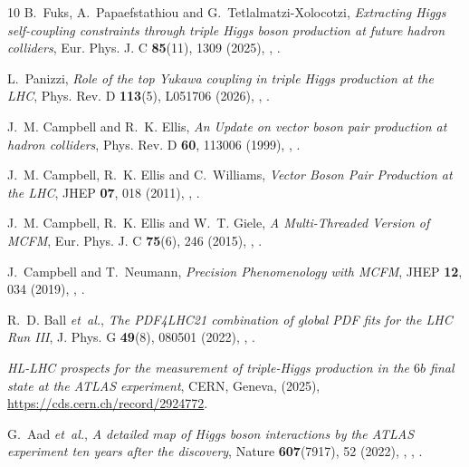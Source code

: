 \documentclass{SciPost}
\begin{document}
\begin{thebibliography}{10}
B.~Fuks, A.~Papaefstathiou and G.~Tetlalmatzi-Xolocotzi,
\newblock \emph{{Extracting Higgs self-coupling constraints through triple Higgs boson production at future hadron colliders}},
\newblock Eur. Phys. J. C \textbf{85}(11), 1309 (2025),
\newblock {},
\newblock {}.

L.~Panizzi,
\newblock \emph{{Role of the top Yukawa coupling in triple Higgs production at the LHC}},
\newblock Phys. Rev. D \textbf{113}(5), L051706 (2026),
\newblock {},
\newblock {}.

J.~M. Campbell and R.~K. Ellis,
\newblock \emph{{An Update on vector boson pair production at hadron colliders}},
\newblock Phys. Rev. D \textbf{60}, 113006 (1999),
\newblock {},
\newblock {}.

J.~M. Campbell, R.~K. Ellis and C.~Williams,
\newblock \emph{{Vector Boson Pair Production at the LHC}},
\newblock JHEP \textbf{07}, 018 (2011),
\newblock {},
\newblock {}.

J.~M. Campbell, R.~K. Ellis and W.~T. Giele,
\newblock \emph{{A Multi-Threaded Version of MCFM}},
\newblock Eur. Phys. J. C \textbf{75}(6), 246 (2015),
\newblock {},
\newblock {}.

J.~Campbell and T.~Neumann,
\newblock \emph{{Precision Phenomenology with MCFM}},
\newblock JHEP \textbf{12}, 034 (2019),
\newblock {},
\newblock {}.

R.~D. Ball \emph{et~al.},
\newblock \emph{{The PDF4LHC21 combination of global PDF fits for the LHC Run III}},
\newblock J. Phys. G \textbf{49}(8), 080501 (2022),
\newblock {},
\newblock {}.

\emph{{HL-LHC prospects for the measurement of triple-Higgs production in the $6b$ final state at the ATLAS experiment}},
\newblock CERN, Geneva, (2025),
\newblock \href{https://cds.cern.ch/record/2924772}{https://cds.cern.ch/record/2924772}.

G.~Aad \emph{et~al.},
\newblock \emph{{A detailed map of Higgs boson interactions by the ATLAS experiment ten years after the discovery}},
\newblock Nature \textbf{607}(7917), 52 (2022),
\newblock {},
,
\newblock {}.


\end{thebibliography}
\end{document}
